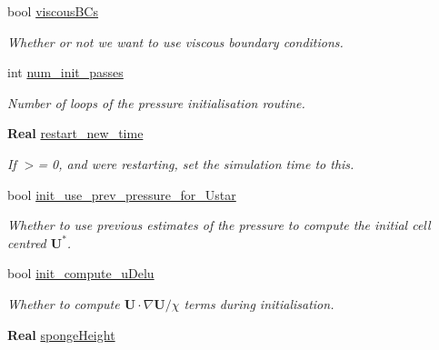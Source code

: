 \begin{DoxyCompactItemize}
bool \hyperlink{struct_mushy_layer_options_ac5ffd9d1d42b13f5eb03e11e581ba061}{viscous\+B\+Cs}
\begin{DoxyCompactList}\small\item\em Whether or not we want to use viscous boundary conditions. \end{DoxyCompactList}\item 
\mbox{\label{struct_mushy_layer_options_a97300ff9c544738642fc73114222e03f}} 
int \hyperlink{struct_mushy_layer_options_a97300ff9c544738642fc73114222e03f}{num\+\_\+init\+\_\+passes}
\begin{DoxyCompactList}\small\item\em Number of loops of the pressure initialisation routine. \end{DoxyCompactList}\item 
\mbox{\label{struct_mushy_layer_options_af701f0c257d0fcbd02df0bb4bfeb4952}} 
\textbf{ Real} \hyperlink{struct_mushy_layer_options_af701f0c257d0fcbd02df0bb4bfeb4952}{restart\+\_\+new\+\_\+time}
\begin{DoxyCompactList}\small\item\em If $>$= 0, and we\textquotesingle{}re restarting, set the simulation time to this. \end{DoxyCompactList}\item 
bool \hyperlink{struct_mushy_layer_options_a647f70bde2bffc9ef777504a9127d298}{init\+\_\+use\+\_\+prev\+\_\+pressure\+\_\+for\+\_\+\+Ustar}
\begin{DoxyCompactList}\small\item\em Whether to use previous estimates of the pressure to compute the initial cell centred $ \mathbf{U}^* $. \end{DoxyCompactList}\item 
bool \hyperlink{struct_mushy_layer_options_a4b9d47e17442336a6ae899dd7bb7ef07}{init\+\_\+compute\+\_\+u\+Delu}
\begin{DoxyCompactList}\small\item\em Whether to compute $ \mathbf{U} \cdot \nabla \mathbf{U}/\chi $ terms during initialisation. \end{DoxyCompactList}\item 
\mbox{\label{struct_mushy_layer_options_a25cbdb9f8b22270abbe9bf0807d28bb5}} 
\textbf{ Real} \hyperlink{struct_mushy_layer_options_a25cbdb9f8b22270abbe9bf0807d28bb5}{sponge\+Height}

\end{DoxyCompactItemize}
